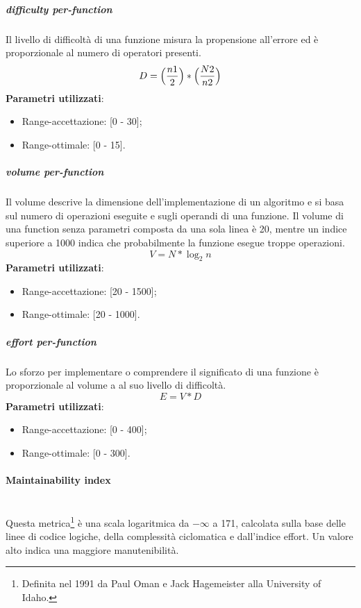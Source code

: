 			
			\subparagraph{ difficulty per-function}
			Il livello di difficoltà di una funzione misura la propensione all'errore ed è proporzionale al numero di operatori presenti. 
			\[
			 D = \Bigl( \frac{n1}{2} \Bigr)  * \Bigl(  \frac{N2}{n2} \Bigr)
			 \]
			\textbf{Parametri utilizzati}:
			\begin{itemize}
				\item Range-accettazione: [0 - 30];
				\item Range-ottimale: [0 - 15].
			\end{itemize}
			
			\subparagraph{ volume per-function}
			Il volume descrive la dimensione dell'implementazione di un algoritmo e si basa sul numero di operazioni eseguite e sugli operandi di una funzione. Il volume di una function senza parametri composta da una sola linea è 20, mentre un indice superiore a 1000 indica che probabilmente la funzione esegue troppe operazioni.
			\[
			 V = N * \log_{2}n
			\]
			\textbf{Parametri utilizzati}:
			\begin{itemize}
				\item Range-accettazione: [20 - 1500];
				\item Range-ottimale: [20 - 1000].
			\end{itemize}

			
			\subparagraph{ effort per-function}
			Lo sforzo per implementare o comprendere il significato di una funzione è proporzionale al volume a al suo livello di difficoltà.
			 \[
			 E = V * D
			\]
			\textbf{Parametri utilizzati}:
			\begin{itemize}
				\item Range-accettazione: [0 - 400];
				\item Range-ottimale: [0 - 300].
			\end{itemize}

			
			\paragraph{Maintainability index}\mbox{} \\

			Questa metrica\footnote{Definita nel 1991 da Paul Oman e Jack Hagemeister alla University of Idaho.} è una scala logaritmica da $-\infty$ a 171, calcolata sulla base delle linee di codice logiche, della complessità ciclomatica e dall'indice  effort. Un valore alto indica una maggiore manutenibilità.


